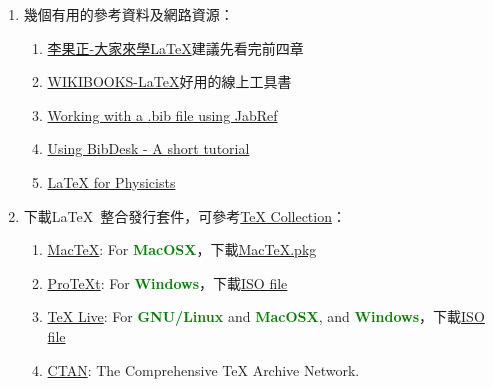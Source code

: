 \begin{acknowledgementsCH}
\begin{enumerate}[leftmargin=0pt, topsep=0pt, itemsep=0pt, label=\Roman{*}.]
\begin{enumerate}[topsep=0pt, itemsep=0pt, label=$\bullet$]
   \end{enumerate}
   \item 幾個有用的參考資料及網路資源：
   \begin{enumerate}[topsep=0pt, itemsep=0pt, label=$\bullet$]
       \item \href{run:./latex123.pdf}{李果正-大家來學\LaTeX}\textemdash 建議先看完前四章
       \item \href{http://en.wikibooks.org/wiki/LaTeX}{WIKIBOOKS-\LaTeX}\textemdash 好用的線上工具書
       \item \href{run:./Working_with_a_bib_file_using_Jabref.pdf}{Working with a .bib file using JabRef}
       \item \href{run:./Fi087_S.pdf}{Using BibDesk - A short tutorial}
       \item \href{http://www.dfcd.net/articles/latex/latex.html}{LaTeX for Physicists}\\
   \end{enumerate}
   \item 下載\LaTeX\ 整合發行套件，可參考\href{http://www.tug.org/texcollection/}{TeX Collection}：\label{it:download}
    \begin{enumerate}[topsep=0pt, itemsep=0pt, label=\arabic{*}.]
        \item \href{http://www.tug.org/mactex/}{MacTeX}: For \textcolor{Green}{\textbf{MacOSX}}，下載\href{http://mirror.ctan.org/systems/mac/mactex/MacTeX.pkg}{MacTeX.pkg}
        \item \href{http://www.tug.org/protext/}{ProTeXt}: For \textcolor{Green}{\textbf{Windows}}，下載\href{ftp://ftp.fernuni-hagen.de/pub/windows/win32/ProTeXt/}{ISO file}
        \item \href{http://www.tug.org/texlive/}{TeX Live}: For \textcolor{Green}{\textbf{GNU/Linux}} and \textcolor{Green}{\textbf{MacOSX}}, and \textcolor{Green}{\textbf{Windows}}，下載\href{http://www.tug.org/texlive/acquire-iso.html}{ISO file}
        \item \href{http://ctan.org/}{CTAN}: The Comprehensive TeX Archive Network.\\
    \end{enumerate}
   

\end{enumerate}
\end{acknowledgementsCH}
